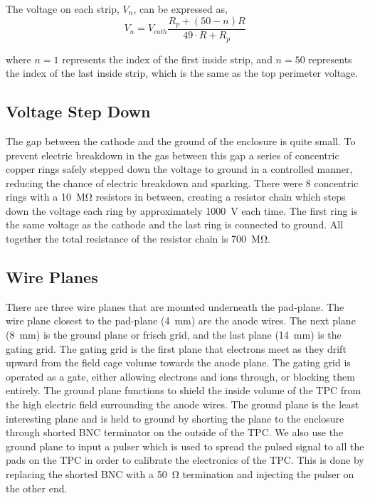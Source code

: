 The voltage on each strip, $V_n$, can be expressed as, 
\begin{equation}
V_n = V_{cath} \frac{R_p + (50 - n)R}{49\cdot R + R_p}
\label{eq:FCstrip}
\end{equation}

where $n = 1$ represents the index of the first inside strip, and $n= 50$ represents the index of the last inside strip, which is the same as the top perimeter voltage.



\subsection{Voltage Step Down}
The gap between the cathode and the ground of the enclosure is quite small. To prevent electric breakdown in the gas between this gap a series of concentric copper rings safely stepped down the voltage to ground in a controlled manner, reducing the chance of electric breakdown and sparking. There were 8 concentric rings with a \SI{10}{\mega\ohm} resistors in between, creating a resistor chain which steps down the voltage each ring by approximately \SI{1000}{\volt} each time. The first ring is the same voltage as the cathode and the last ring is connected to ground. All together the total resistance of the resistor chain is \SI{700}{\mega\ohm}.


\subsection{Wire Planes}
\label{sec:wireplanes}

There are three wire planes that are mounted underneath the pad-plane. The wire plane closest to the pad-plane (\SI{4}{\milli\metre}) are the anode wires. The next plane (\SI{8}{\milli\metre}) is the ground plane or frisch grid, and the last plane (\SI{14}{\milli\metre}) is the gating grid. The gating grid is the first plane that electrons meet as they drift upward from the field cage volume towards the anode plane. The gating grid is operated as a gate, either allowing electrons and ions through, or blocking them entirely. The ground plane functions to shield the inside volume of the TPC from the high electric field surrounding the anode wires. The ground plane is the least interesting plane and is held to ground by shorting the plane to the enclosure through  shorted BNC terminator on the outside of the TPC. We also use the ground plane to input a pulser which is used to spread the pulsed signal to all the pads on the TPC in order to calibrate the electronics of the TPC. This is done by replacing the shorted BNC with a \SI{50}{\ohm} termination and injecting the pulser on the other end. 


